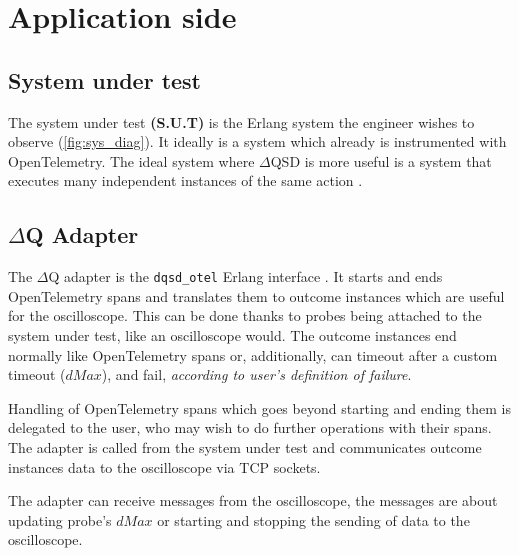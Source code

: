 \section{Application side} 
    \subsection{System under test} The system under test \textbf{(S.U.T)} is the Erlang system the engineer wishes to observe (\cref{fig:sys_diag}). It ideally is a system which already is instrumented with OpenTelemetry. The ideal system where $\Delta$QSD is more useful is a system that executes many independent instances of the same action \cite{dq-tut}. 
    
    \subsection{$\Delta$Q Adapter} 
    The $\Delta$Q adapter is the \texttt{dqsd\_otel} Erlang interface \cite{wrapper}. It starts and ends OpenTelemetry spans and translates them to outcome instances which are useful for the oscilloscope. This can be done thanks to probes being attached to the system under test, like an oscilloscope would. The outcome instances end normally like OpenTelemetry spans or, additionally, can timeout after a custom timeout ($dMax$), and fail, \textit{according to user's definition of failure}. 
    
    Handling of OpenTelemetry spans which goes beyond starting and ending them is delegated to the user, who may wish to do further operations with their spans. 
    The adapter is called from the system under test and communicates outcome instances data to the oscilloscope via TCP sockets. 
    
    The adapter can receive messages from the oscilloscope, the messages are about updating probe's $dMax$ or starting and stopping the sending of data to the oscilloscope.
